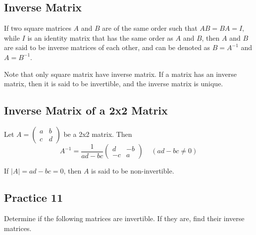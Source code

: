 \documentclass{report}
\begin{document}
\begin{multicols}{2}
  \section{Inverse Matrix}

  If two square matrices $A$ and $B$ are of the same order such that $AB=BA=I$,
  while $I$ is an identity matrix that has the same order as $A$ and $B$, then
  $A$ and $B$ are said to be inverse matrices of each other, and can be denoted
  as $B = A^{-1}$ and $A = B^{-1}$.

  Note that only square matrix have inverse matrix. If a matrix has an inverse
  matrix, then it is said to be invertible, and the inverse matrix is unique.

  \subsection*{Inverse Matrix of a 2x2 Matrix}

  Let $A = \begin{pmatrix} a & b \\ c & d \end{pmatrix}$ be a 2x2 matrix. Then
  \[
    A^{-1} = \frac{1}{ad-bc} \begin{pmatrix} d & -b \\ -c & a \end{pmatrix}
    \ \ \ \ \ (ad-bc \neq 0)
  \]

  If $|A| = ad - bc = 0$, then $A$ is said to be non-invertible.

  \subsection{Practice 11}

  Determine if the following matrices are invertible. If they are, find their
  inverse matrices.


\end{multicols}
\end{document}
